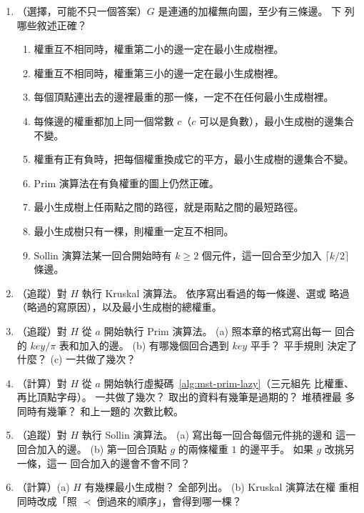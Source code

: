 \begin{enumerate}
\item \label{q:mst-choice}（選擇，可能不只一個答案）$G$ 是連通的加權無向圖，至少有三條邊。 下
列哪些敘述正確？
\begin{enumerate}
\item 權重互不相同時，權重第二小的邊一定在最小生成樹裡。
\item 權重互不相同時，權重第三小的邊一定在最小生成樹裡。
\item 每個頂點連出去的邊裡最重的那一條，一定不在任何最小生成樹裡。
\item 每條邊的權重都加上同一個常數 $c$（$c$ 可以是負數），最小生成樹的邊集合不變。
\item 權重有正有負時，把每個權重換成它的平方，最小生成樹的邊集合不變。
\item Prim 演算法在有負權重的圖上仍然正確。
\item 最小生成樹上任兩點之間的路徑，就是兩點之間的最短路徑。
\item 最小生成樹只有一棵，則權重一定互不相同。
\item Sollin 演算法某一回合開始時有 $k \ge 2$ 個元件，這一回合至少加入 $\lceil k/2 \rceil$ 條邊。
\end{enumerate}

\item \label{q:mst-kruskal-h}（追蹤）對 $H$ 執行 Kruskal 演算法。 依序寫出看過的每一條邊、選或
略過（略過的寫原因），以及最小生成樹的總權重。

\item \label{q:mst-prim-h}（追蹤）對 $H$ 從 $a$ 開始執行 Prim 演算法。 (a) 照本章的格式寫出每一
回合的 $\mathit{key}/\pi$ 表和加入的邊。 (b) 有哪幾個回合遇到 $\mathit{key}$ 平手？ 平手規則
決定了什麼？ (c)  一共做了幾次？

\item \label{q:mst-lazy-h}（計算）對 $H$ 從 $a$ 開始執行虛擬碼~\ref{alg:mst-prim-lazy}（三元組先
比權重、再比頂點字母）。  一共做了幾次？ 取出的資料有幾筆是過期的？ 堆積裡最
多同時有幾筆？ 和上一題的  次數比較。

\item \label{q:mst-sollin-h}（追蹤）對 $H$ 執行 Sollin 演算法。 (a) 寫出每一回合每個元件挑的邊和
這一回合加入的邊。 (b) 第一回合頂點 $g$ 的兩條權重 $1$ 的邊平手。 如果 $g$ 改挑另一條，這一
回合加入的邊會不會不同？

\item \label{q:mst-count-h}（計算）(a) $H$ 有幾棵最小生成樹？ 全部列出。 (b) Kruskal 演算法在權
重相同時改成「照 $\prec$ 倒過來的順序」，會得到哪一棵？


\end{enumerate}
